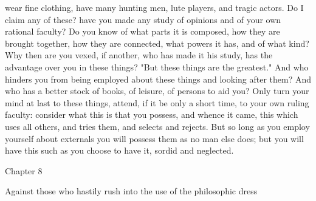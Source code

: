\documentclass[a4paper]{article}
\begin{document}
wear fine clothing, have many hunting men, lute players, and tragic actors. Do
I claim any of these? have you made any study of opinions and of your own
rational faculty? Do you know of what parts it is composed, how they are
brought together, how they are connected, what powers it has, and of what kind?
Why then are you vexed, if another, who has made it his study, has the
advantage over you in these things? "But these things are the greatest." And
who hinders you from being employed about these things and looking after them?
And who has a better stock of books, of leisure, of persons to aid you? Only
turn your mind at last to these things, attend, if it be only a short time, to
your own ruling faculty: consider what this is that you possess, and whence it
came, this which uses all others, and tries them, and selects and rejects. But
so long as you employ yourself about externals you will possess them as no man
else does; but you will have this such as you choose to have it, sordid and
neglected.

Chapter 8

Against those who hastily rush into the use of the philosophic dress
\end{document}
